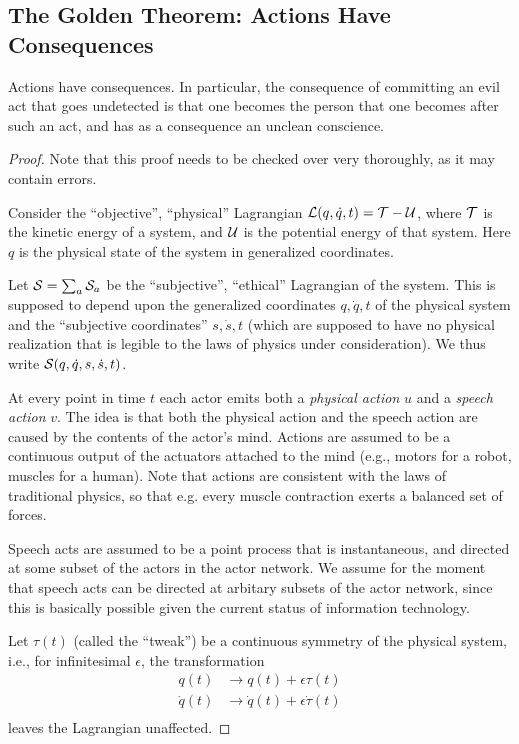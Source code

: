\documentclass{article}
\begin{document}
\subsection{The Golden Theorem: Actions Have Consequences} 

\begin{thm}
  Actions have consequences. In particular, the consequence of
  committing an evil act that goes undetected is that one becomes the
  person that one becomes after such an act, and has as a consequence
  an unclean conscience.
\end{thm}

\begin{proof}
  Note that this proof needs to be checked over very thoroughly, as it
  may contain errors.

  Consider the ``objective'', ``physical'' Lagrangian ${\mathcal L}(q,
  \dot{q}, t) = {\mathcal T} - {\mathcal U}$, where ${\mathcal T}$ is the kinetic energy of a
  system, and ${\mathcal U}$ is the potential energy of that system. Here $q$
  is the physical state of the system in generalized coordinates.

  Let ${\mathcal S} = \sum_a {\mathcal S}_a$ be the ``subjective'', ``ethical''
  Lagrangian of the system. This is supposed to depend upon the
  generalized coordinates $q, \dot{q}, t$ of the physical system and
  the ``subjective coordinates'' $s, \dot{s}, t$ (which are supposed
  to have no physical realization that is legible to the laws of
  physics under consideration). We thus write ${\mathcal S}(q, \dot{q}, s,
  \dot{s}, t)$.

  At every point in time $t$ each actor emits both a {\em physical
    action} $u$ and a {\em speech action} $v$. The idea is that both
  the physical action and the speech action are caused by the contents
  of the actor's mind. Actions are assumed to be a continuous output
  of the actuators attached to the mind (e.g., motors for a robot,
  muscles for a human). Note that actions are consistent with the laws
  of traditional physics, so that e.g. every muscle contraction exerts
  a balanced set of forces.

  Speech acts are assumed to be a point process that is instantaneous,
  and directed at some subset of the actors in the actor network. We
  assume for the moment that speech acts can be directed at arbitary
  subsets of the actor network, since this is basically possible given
  the current status of information technology.

  Let $\tau(t)$ (called the ``tweak'') be a continuous symmetry of the
  physical system, i.e., for infinitesimal $\epsilon$, the
  transformation
  \begin{align*}
    q(t) &\to q(t) + \epsilon \tau(t) \\
    \dot{q}(t) &\to \dot{q}(t) + \epsilon \dot{\tau}(t) \\
  \end{align*}
  leaves the Lagrangian unaffected.


\end{proof}
\end{document}

